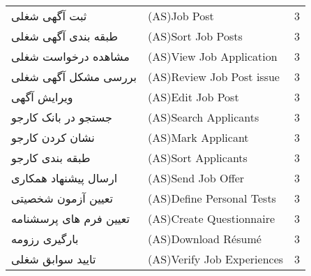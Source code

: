 \documentclass[12pt]{article}
\begin{document}
\begin{table}[]
\begin{tabular}{lll}
			ثبت آگهی شغلی                        & (AS)Job Post                                                                                                  & 3     \\
			طبقه بندی آگهی شغلی                  & (AS)Sort Job Posts                                                                                            & 3     \\
			مشاهده درخواست شغلی                  & (AS)View Job Application                                                                                      & 3     \\
			بررسی مشکل آگهی شغلی                 & (AS)Review Job Post issue                                                                                     & 3     \\
			ویرایش آگهی                          & (AS)Edit Job Post                                                                                             & 3     \\
			جستجو در بانک کارجو                  & (AS)Search Applicants                                                                                         & 3     \\
			نشان کردن کارجو                      & (AS)Mark Applicant                                                                                            & 3     \\
			طبقه بندی کارجو                      & (AS)Sort Applicants                                                                                           & 3     \\
			ارسال پیشنهاد همکاری                 & (AS)Send Job Offer                                                                                            & 3     \\
			تعیین آزمون شخصیتی                   & (AS)Define Personal Tests                                                                                     & 3     \\
			تعیین فرم های پرسشنامه               & (AS)Create Questionnaire                                                                                      & 3     \\
			بارگیری رزومه                        & (AS)Download Résumé                                                                                           & 3     \\
			تایید سوابق شغلی                     & (AS)Verify Job Experiences                                                                                    & 3     \\

\end{tabular}
\end{table}
\end{document}
